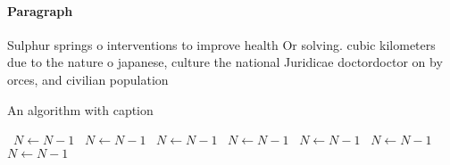 \documentclass[a4paper]{article}
\begin{document}
\paragraph{Paragraph}
Sulphur springs o interventions to improve health Or solving. cubic kilometers due to the nature o japanese, culture the national Juridicae doctordoctor on by orces, and civilian population


\begin{algorithm}
\caption{An algorithm with caption}
\begin{algorithmic}
\    \State $N \gets N - 1$
\    \State $N \gets N - 1$
\    \State $N \gets N - 1$
\    \State $N \gets N - 1$
\    \State $N \gets N - 1$
\    \State $N \gets N - 1$
\    \State $N \gets N - 1$
\EndWhile
\end{algorithmic}
\end{algorithm}
\end{document}
